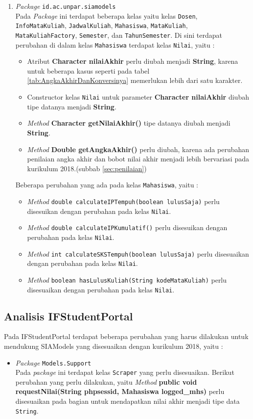 \begin{enumerate}
	\item \textit{Package} \texttt{id.ac.unpar.siamodels}\\
	Pada \textit{Package} ini terdapat beberapa kelas yaitu kelas \texttt{Dosen}, \texttt{InfoMataKuliah}, \texttt{JadwalKuliah}, \texttt{Mahasiswa}, \texttt{MataKuliah}, \texttt{MataKuliahFactory}, \texttt{Semester}, dan \texttt{TahunSemester}. Di sini terdapat perubahan di dalam kelas \texttt{Mahasiswa} terdapat kelas \texttt{Nilai}, yaitu :
	\begin{itemize}
		\item Atribut \textbf{Character nilaiAkhir} perlu diubah menjadi \textbf{String}, karena untuk beberapa kasus seperti pada tabel \ref{tab:AngkaAkhirDanKonversinya} memerlukan lebih dari satu karakter.
		\item Constructor kelas \texttt{Nilai} untuk parameter \textbf{Character nilaiAkhir} diubah tipe datanya menjadi \textbf{String}.
		\item \textit{Method} \textbf{Character getNilaiAkhir()} tipe datanya diubah menjadi \textbf{String}.
		\item \textit{Method} \textbf{Double getAngkaAkhir()} perlu diubah, karena ada perubahan penilaian angka akhir dan bobot nilai akhir menjadi lebih bervariasi pada kurikulum 2018.(subbab \ref{sec:penilaian}) 
	\end{itemize}
	Beberapa perubahan yang ada pada kelas \texttt{Mahasiswa}, yaitu :
	\begin{itemize}
		\item \textit{Method} \texttt{double calculateIPTempuh(boolean lulusSaja)} perlu disesuikan dengan perubahan pada kelas \texttt{Nilai}.
		\item \textit{Method} \texttt{double calculateIPKumulatif()} perlu disesuikan dengan perubahan pada kelas \texttt{Nilai}.
		\item \textit{Method} \texttt{int calculateSKSTempuh(boolean lulusSaja)} perlu disesuaikan dengan perubahan pada kelas \texttt{Nilai}.
		\item \textit{Method} \texttt{boolean hasLulusKuliah(String kodeMataKuliah)} perlu disesuaikan dengan perubahan pada kelas \texttt{Nilai}.
	\end{itemize}
\end{enumerate}

\subsection{Analisis IFStudentPortal}
\label{subbab:analisisifstudentportal}

Pada IFStudentPortal terdapat beberapa perubahan yang harus dilakukan untuk mendukung SIAModels yang disesuaikan dengan kurikulum 2018, yaitu :
\begin{itemize}
	\item \textit{Package} \texttt{Models.Support} \\
	Pada \textit{package} ini terdapat kelas \texttt{Scraper} yang perlu disesuaikan. Berikut perubahan yang perlu dilakukan, yaitu \textit{Method} \textbf{public void requestNilai(String phpsessid, Mahasiswa logged\_mhs)} perlu disesuaikan pada bagian untuk mendapatkan nilai akhir menjadi tipe data \texttt{String}.
\end{itemize}
